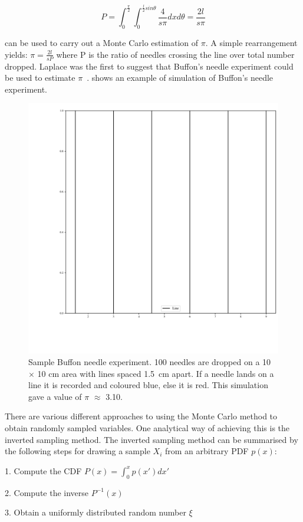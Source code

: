 \begin{equation}
P=\int_0^{\frac{\pi}{2}}\int_0^{\frac{l}{2}sin\theta}\frac{4}{s\pi}dx d\theta = \frac{2 l}{s \pi}\label{eqn:buffon}
\end{equation}


 can be used to carry out a Monte Carlo estimation of $\pi$. A simple rearrangement yields: $\pi = \tfrac{2l}{sP}$ where P is the ratio of needles crossing the line over total number dropped. Laplace was the first to suggest that Buffon's needle experiment could be used to estimate $\pi$~\cite{beckmann2015history}.  shows an example of simulation of Buffon's needle experiment.

\begin{figure}[!htb]
\centering
\includegraphics[width=.65\textwidth]{buffon.pdf}
\caption{Sample Buffon needle experiment. 100 needles are dropped on a 10 $\times$ 10 cm area with lines spaced 1.5~cm apart. If a needle lands on a line it is recorded and coloured blue, else it is red. This simulation gave a value of $\pi$ $\approx$ 3.10.}
\label{fig:buffon-needle}
\end{figure}

There are various different approaches to using the Monte Carlo method to obtain randomly sampled variables.
One analytical way of achieving this is the inverted sampling method.
The inverted sampling method can be summarised by the following steps for drawing a sample $X_i$ from an arbitrary PDF $p(x)$:

1. Compute the CDF $P(x)=\int^{x}_{0}p(x')dx'$

2. Compute the inverse $P^{-1}(x)$

3. Obtain a uniformly distributed random number $\xi$

